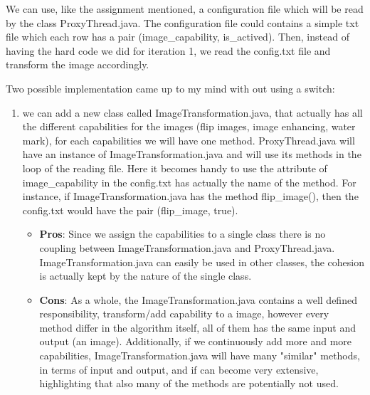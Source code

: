We can use, like the assignment mentioned, a configuration file which will be read by the class ProxyThread.java. The configuration file could contains a simple txt file which each row has a pair (image\_capability, is\_actived). Then, instead of having the hard code we did for iteration 1, we read the config.txt file and transform the image accordingly.
\par
Two possible implementation came up to my mind with out using a switch:
\begin{enumerate}
  \item we can add a new class called ImageTransformation.java, that actually has all the different capabilities for the images (flip images, image enhancing, water mark), for each capabilities we will have one method. ProxyThread.java  will have an instance of ImageTransformation.java and will use its methods in the loop of the reading file. Here it becomes handy to use the attribute of image\_capability in the config.txt has actually the name of the method. For instance, if ImageTransformation.java has the method flip\_image(), then the config.txt would have the pair (flip\_image, true).
  \begin{itemize}
     \item \textbf{Pros}: Since we assign the capabilities to a single class there is no coupling between ImageTransformation.java and ProxyThread.java. ImageTransformation.java can easily be used in other classes, the cohesion is actually kept by the nature of the single class.
     \item \textbf{Cons}: As a whole, the ImageTransformation.java contains a well defined responsibility, transform/add capability to a image, however every method differ in the algorithm itself, all of them has the same input and output (an image). Additionally, if we continuously add more and more capabilities, ImageTransformation.java will have many "similar" methods, in terms of input and output, and if can become very extensive, highlighting that also many of the methods are potentially not used.
   \end{itemize}
   

\end{enumerate}
